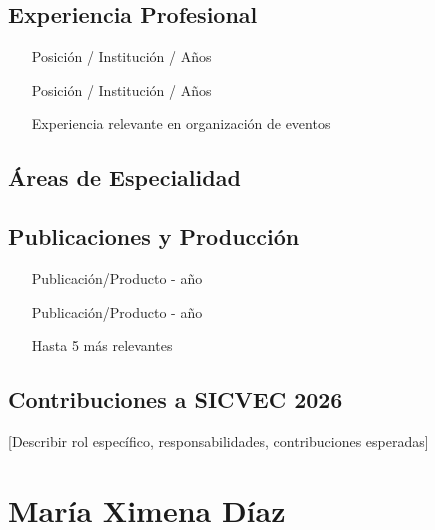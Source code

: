 \documentclass[12pt,a4paper]{article}
\begin{document}
\subsection{Experiencia Profesional}

\begin{itemize}[label={\textcolor{verdemid}{\textbullet}}]
  \item [Posición / Institución / Años]
  \item [Posición / Institución / Años]
  \item [Experiencia relevante en organización de eventos]
\end{itemize}

\subsection{Áreas de Especialidad}

\begin{tcolorbox}
\end{tcolorbox}

\subsection{Publicaciones y Producción}

\begin{enumerate}[label={\textcolor{verdeosc}{\arabic{*}.}}]
  \item [Publicación/Producto - año]
  \item [Publicación/Producto - año]
  \item [Hasta 5 más relevantes]
\end{enumerate}

\subsection{Contribuciones a SICVEC 2026}

[Describir rol específico, responsabilidades, contribuciones esperadas]

\vspace{1.5cm}

\section{María Ximena Díaz}
\end{document}
